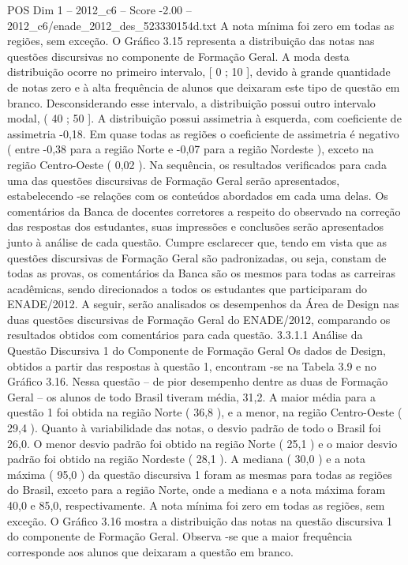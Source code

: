 \begin{textsample}{POS Dim 1 – 2012\_c6 – Score -2.00 – 2012\_c6/enade\_2012\_des\_523330154d.txt}
A nota mínima foi zero em todas as regiões, sem exceção.
O Gráfico 3.15 representa a distribuição das notas nas questões discursivas no componente de Formação Geral.
A moda desta distribuição ocorre no primeiro intervalo, [ 0 ; 10 ], devido à grande quantidade de notas zero e à alta frequência de alunos que deixaram este tipo de questão em branco.
Desconsiderando esse intervalo, a distribuição possui outro intervalo modal, ( 40 ; 50 ].
A distribuição possui assimetria à esquerda, com coeficiente de assimetria -0,18.
Em quase todas as regiões o coeficiente de assimetria é negativo ( entre -0,38 para a região Norte e -0,07 para a região Nordeste ), exceto na região Centro-Oeste ( 0,02 ).
Na sequência, os resultados verificados para cada uma das questões discursivas de Formação Geral serão apresentados, estabelecendo -se relações com os conteúdos abordados em cada uma delas.
Os comentários da Banca de docentes corretores a respeito do observado na correção das respostas dos estudantes, suas impressões e conclusões serão apresentados junto à análise de cada questão.
Cumpre esclarecer que, tendo em vista que as questões discursivas de Formação Geral são padronizadas, ou seja, constam de todas as provas, os comentários da Banca são os mesmos para todas as carreiras acadêmicas, sendo direcionados a todos os estudantes que participaram do ENADE/2012.
A seguir, serão analisados os desempenhos da Área de Design nas duas questões discursivas de Formação Geral do ENADE/2012, comparando os resultados obtidos com comentários para cada questão. 3.3.1.1 Análise da Questão Discursiva 1 do Componente de Formação Geral Os dados de Design, obtidos a partir das respostas à questão 1, encontram -se na Tabela 3.9 e no Gráfico 3.16.
Nessa questão – de pior desempenho dentre as duas de Formação Geral – os alunos de todo Brasil tiveram média, 31,2.
A maior média para a questão 1 foi obtida na região Norte ( 36,8 ), e a menor, na região Centro-Oeste ( 29,4 ).
Quanto à variabilidade das notas, o desvio padrão de todo o Brasil foi 26,0.
O menor desvio padrão foi obtido na região Norte ( 25,1 ) e o maior desvio padrão foi obtido na região Nordeste ( 28,1 ).
A mediana ( 30,0 ) e a nota máxima ( 95,0 ) da questão discursiva 1 foram as mesmas para todas as regiões do Brasil, exceto para a região Norte, onde a mediana e a nota máxima foram 40,0 e 85,0, respectivamente.
A nota mínima foi zero em todas as regiões, sem exceção.
O Gráfico 3.16 mostra a distribuição das notas na questão discursiva 1 do componente de Formação Geral.
Observa -se que a maior frequência corresponde aos alunos que deixaram a questão em branco.

\end{textsample}
